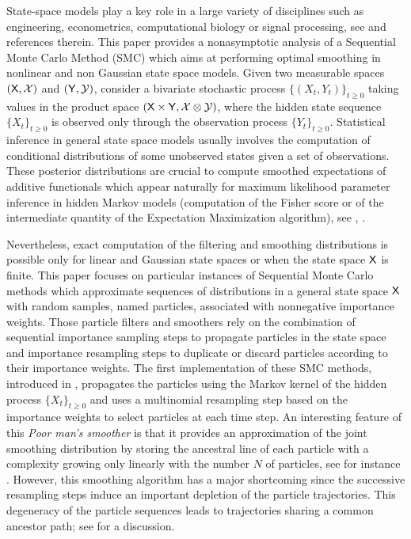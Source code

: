 State-space models play a key role in a large variety of disciplines such as engineering, econometrics, computational biology or signal processing, see \cite{doucet:defreitas:gordon:2001,douc:moulines:stoffer:2014} and references therein. This paper provides a nonasymptotic analysis of a Sequential Monte Carlo Method (SMC) which aims at performing optimal smoothing in nonlinear and non Gaussian state space models. Given two measurable spaces $(\mathsf{X},\mathcal{X})$ and $(\mathsf{Y},\mathcal{Y})$, consider a bivariate stochastic process $\{(X_{t},Y_{t})\}_{t\geq 0}$ taking values in the product space $(\mathsf{X}\times\mathsf{Y},\mathcal{X}\otimes\mathcal{Y})$, where the hidden state sequence $\{X_{t}\}_{t\geq 0}$ is observed only through the observation process $\{Y_{t}\}_{t\geq 0}$.
Statistical inference in general state space models usually involves the computation  of conditional distributions of some unobserved states given a set of observations. These posterior distributions are crucial to compute smoothed expectations of additive functionals which appear naturally for maximum likelihood parameter inference in hidden Markov models (computation of the Fisher score or of the intermediate quantity of the Expectation Maximization algorithm), see \cite[Chapter $10$ and $11$]{cappe:moulines:ryden:2005}, \cite{kantas:doucet:signh:2015,doucet:poyiadjis:singh:2011,lecorff:fort:2013a,lecorff:fort:2013b}.

Nevertheless, exact computation of the filtering and smoothing distributions is possible only for linear and Gaussian state spaces or when the state space $\mathsf{X}$ is finite. This paper focuses on particular  instances of Sequential Monte Carlo methods which approximate sequences of distributions in a general state space $\mathsf{X}$ with random samples, named particles, associated with nonnegative importance weights. Those particle filters and smoothers rely on the combination of sequential importance sampling steps to propagate particles in the state space and importance resampling steps to duplicate or discard particles according to their importance weights. The first implementation of these SMC methods, introduced in \cite{gordon:salmond:smith:1993,kitagawa:1996}, propagates the particles using the Markov kernel of the hidden process $\{X_{t}\}_{t\geq 0}$ and uses a multinomial resampling step based on the importance weights to select particles at each time step. An interesting feature of this {\em Poor man's smoother} is that it provides an approximation of the joint smoothing distribution by storing the ancestral line of each particle with a complexity growing only linearly with the number $N$ of particles, see for instance \cite{delmoral:2004}. However, this smoothing algorithm has a major shortcoming since the successive resampling steps induce  an important  depletion of the particle trajectories. This degeneracy of the particle sequences leads to trajectories sharing a common ancestor path; see \cite{doucet:poyiadjis:singh:2011,jacob:murray:rubenthaler:2013} for a discussion.



